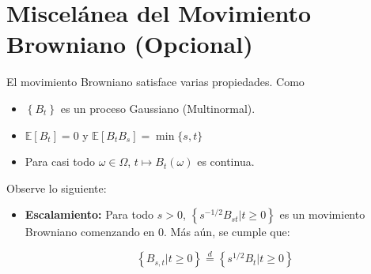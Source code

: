 
\section{Miscelánea del Movimiento Browniano (Opcional)}

El movimiento Browniano satisface varias propiedades. Como

\begin{itemize}
	\item $\left\{ B_t \right\}$ es un proceso Gaussiano (Multinormal).
	\item $\mathbb{E}[B_t] = 0$ y $\mathbb{E}[B_t B_s] = \min\{ s, t \}$
	\item Para casi todo $\omega \in \Omega$, $t \mapsto B_t (\omega)$ es continua.
\end{itemize}


Observe lo siguiente:

\begin{itemize}
	\item \textbf{Escalamiento: } Para todo $s > 0$, $\left\{ s^{-1/2} B_{st} \vert t \geq 0 \right\}$ es un movimiento Browniano comenzando en 0. Más aún, se cumple que:

	\[
		\left\{ B_{s,t} \vert t \geq 0 \right\}  \stackrel{d}{=}  \left\{ s^{1/2} B_t \vert t \geq 0 \right\}
	\]
\end{itemize}